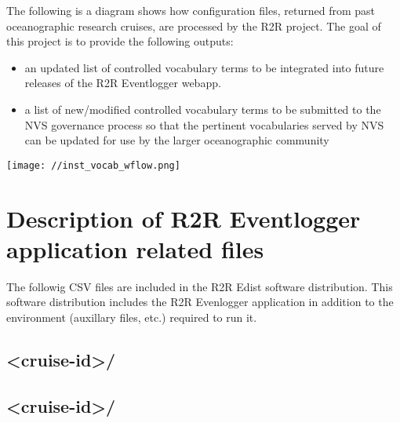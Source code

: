 \documentclass[11pt]{article}
\begin{document}
The following is a diagram shows how configuration files, returned from past oceanographic research cruises, are processed by the R2R project. The goal of this project is to provide the following outputs:
\begin{itemize}
\item an updated list of controlled vocabulary terms to be integrated into future releases of the R2R Eventlogger webapp.
\item a list of new/modified controlled vocabulary terms to be submitted to the NVS governance process so that the pertinent vocabularies served by NVS can be updated for use by the larger oceanographic community
\end{itemize}
\texttt{[image: //inst\_vocab\_wflow.png]}
\section{Description of R2R Eventlogger application related files}
\label{sec-3}

The followig CSV files are included in the R2R Edist software distribution. This software distribution includes the R2R Evenlogger application in addition to the environment (auxillary files, etc.) required to run it.
\subsection{<cruise-id>/}
\label{sec-3-1}
\subsection{<cruise-id>/}
\label{sec-3-2}
\section{}
\end{document}
